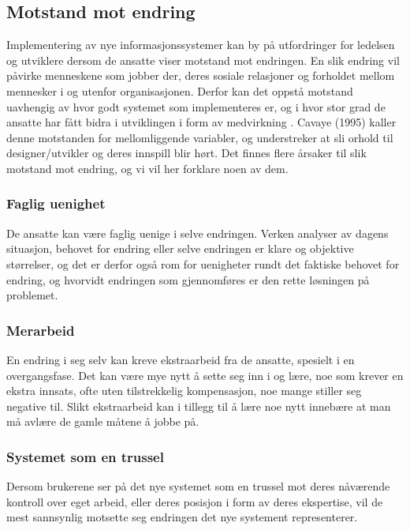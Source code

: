 \subsection{Motstand mot endring}
\label{chp: motstand}

Implementering av nye informasjonssystemer kan by på utfordringer for ledelsen og utviklere dersom de ansatte viser motstand mot endringen. 
En slik endring vil påvirke menneskene som jobber der, deres sosiale relasjoner og forholdet mellom mennesker i og utenfor organisasjonen. Derfor kan det oppstå motstand uavhengig av hvor godt systemet som implementeres er, og i hvor stor grad de ansatte har fått bidra i utviklingen i form av medvirkning \cite{Jacobsen12}. Cavaye (1995) kaller denne motstanden for mellomliggende variabler, og understreker at sli
orhold til designer/utvikler og deres innspill blir hørt. Det finnes flere årsaker til slik motstand mot endring, og vi vil her forklare noen av dem. 

\subsubsection{Faglig uenighet}
De ansatte kan være faglig uenige i selve endringen. Verken analyser av dagens situasjon, behovet for endring eller selve endringen er klare og objektive størrelser, og det er derfor også rom for uenigheter rundt det faktiske behovet for endring, og hvorvidt endringen som gjennomføres er den rette løsningen på problemet. \cite{Jacobsen12}

\subsubsection{Merarbeid}
En endring i seg selv kan kreve ekstraarbeid fra de ansatte, spesielt i en overgangsfase. Det kan være mye nytt å sette seg inn i og lære, noe som krever en ekstra innsats, ofte uten tilstrekkelig kompensasjon, noe mange stiller seg negative til. Slikt ekstraarbeid kan i tillegg til å lære noe nytt innebære at man må avlære de gamle måtene å jobbe på. \cite{Jacobsen12}

\subsubsection{Systemet som en trussel}
Dersom brukerene ser på det nye systemet som en trussel mot deres nåværende kontroll over eget arbeid, eller deres posisjon i form av deres ekspertise, vil de mest sannsynlig motsette seg endringen det nye systement representerer. \cite{Cavaye95}

